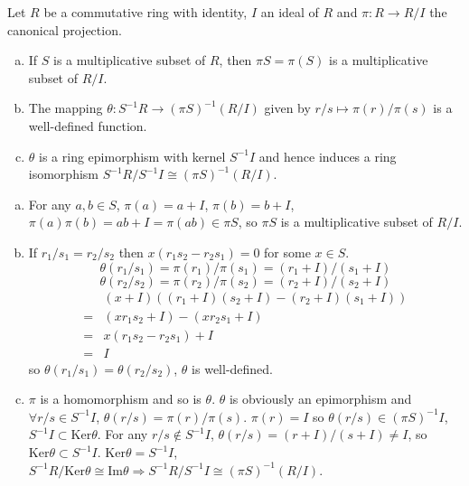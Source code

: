 $$ $$

\begin{ex}
    Let $R$ be a commutative ring with identity, $I$ an ideal of $R$ and $\pi:R\to R /I$ the canonical projection.
    \begin{enumerate}[(a)]
        \item If $S$ is a multiplicative subset of $R$, then $\pi S=\pi(S)$ is a multiplicative subset of $R /I$.
        \item The mapping $\theta:S^{-1}R\to (\pi S)^{-1}(R/I)$ given by $r /s\mapsto \pi(r) /\pi(s)$ is a well-defined function.
        \item $\theta$ is a ring epimorphism with kernel $S^{-1}I$ and hence induces a ring isomorphism $S^{-1}R /S^{-1}I\cong (\pi S)^{-1}(R /I)$.
    \end{enumerate}
\end{ex}

\begin{answer}
    \begin{enumerate}[(a)]
        \item For any $a,b\in S$, $\pi(a)=a+I$, $\pi(b)=b+I$, $\pi(a)\pi(b)=ab+I=\pi(ab)\in \pi S$, so $\pi S$ is a multiplicative subset of $R /I$.
        \item If $r_{1}/s_{1}=r_{2} /s_{2}$ then $x(r_{1}s_{2}-r_{2}s_{1})=0$ for some $x\in S$.\[\theta(r_{1} /s_{1})=\pi(r_{1}) / \pi(s_{1})=(r_{1}+I) /(s_{1}+I)\]\[\theta(r_{2} /s_{2})=\pi(r_{2}) /\pi(s_{2})=(r_{2}+I) /(s_{2}+I)\]\[\begin{aligned}
            &(x+I)((r_{1}+I)(s_{2}+I)-(r_{2}+I)(s_{1}+I))\\=&(xr_{1}s_{2}+I)-(xr_{2}s_{1}+I)\\=&x(r_{1}s_{2}-r_{2}s_{1})+I\\=&I
        \end{aligned}\] so $\theta(r_{1} /s_{1})=\theta(r_{2} /s_{2})$, $\theta$ is well-defined.
        \item $\pi$ is a homomorphism and so is $\theta$. $\theta$ is obviously an epimorphism and $\forall r /s\in S^{-1}I$, $\theta(r /s)=\pi(r) /\pi(s)$. $\pi(r)= I$ so $\theta(r /s)\in (\pi S)^{-1}I$, $S^{-1}I\subset \mathrm{Ker}\theta$. For any $r /s\notin S^{-1}I$, $\theta(r /s)=(r+I) /(s+I)\neq I$, so $\mathrm{Ker}\theta\subset S^{-1}I$. $\mathrm{Ker}\theta=S^{-1}I$, $S^{-1}R /\mathrm{Ker}\theta\cong \mathrm{Im}\theta\Rightarrow S^{-1}R /S^{-1}I\cong (\pi S)^{-1}(R /I)$.
    \end{enumerate}
\end{answer}

